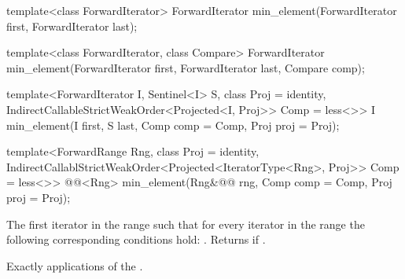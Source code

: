 %
\begin{removedblock}
\begin{itemdecl}
template<class ForwardIterator>
  ForwardIterator min_element(ForwardIterator first, ForwardIterator last);

template<class ForwardIterator, class Compare>
  ForwardIterator min_element(ForwardIterator first, ForwardIterator last,
                            Compare comp);
\end{itemdecl}
\end{removedblock}
\begin{addedblock}
\begin{itemdecl}
template<ForwardIterator I, Sentinel<I> S, class Proj = identity,
    IndirectCallableStrictWeakOrder<Projected<I, Proj>> Comp = less<>>
  I min_element(I first, S last, Comp comp = Comp{}, Proj proj = Proj{});

template<ForwardRange Rng, class Proj = identity,
    IndirectCallablStrictWeakOrder<Projected<IteratorType<Rng>, Proj>> Comp = less<>>
  @@<Rng>
    min_element(Rng&@\newtxt{\&}@ rng, Comp comp = Comp{}, Proj proj = Proj{});
\end{itemdecl}
\end{addedblock}

\begin{itemdescr}
\pnum
\returns
The first iterator
in the range
such that for every iterator
in the range
the following corresponding conditions hold:
.
Returns
if
.

\pnum
\complexity
Exactly
applications of the .
\end{itemdescr}

